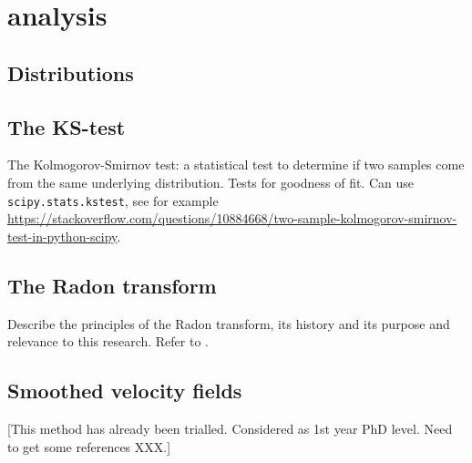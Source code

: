 \section{analysis}

\subsection{Distributions}

\subsection{The KS-test}
The Kolmogorov-Smirnov test: a statistical test to determine if two samples come from the same underlying distribution. Tests for goodness of fit. Can use \texttt{scipy.stats.kstest}, see for example \url{https://stackoverflow.com/questions/10884668/two-sample-kolmogorov-smirnov-test-in-python-scipy}.

\subsection{The Radon transform}
Describe the principles of the Radon transform, its history and its purpose and relevance to this research. Refer to \cite{2018MNRAS.480.2217S}.

\subsection{Smoothed velocity fields}
[This method has already been trialled. Considered as 1st year PhD level. Need to get some references XXX.]